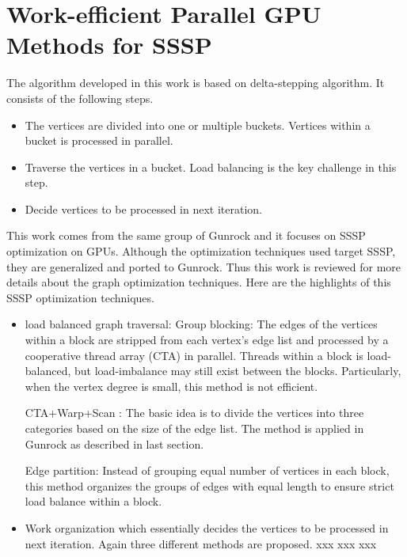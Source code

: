 \section{Work-efficient Parallel GPU Methods for SSSP}
The algorithm developed in this work \cite{Davidson2014work-efficient} is based
on delta-stepping algorithm. It consists of the following steps.
\begin{itemize}
    \item The vertices are divided into one or multiple buckets. Vertices within
        a bucket is processed in parallel.
    \item Traverse the vertices in a bucket. Load balancing is the key challenge
        in this step.
    \item Decide vertices to be processed in next iteration.
\end{itemize}

This work comes from the same group of Gunrock and it focuses on SSSP
optimization on GPUs. Although the optimization techniques used target
SSSP, they are generalized and ported to Gunrock. Thus this work is reviewed
for more details about the graph optimization techniques. Here are the highlights of
this SSSP optimization techniques.


\begin{itemize}
    \item load balanced graph traversal:
        \subitem Group blocking: The edges of the vertices within a block are
        stripped from each vertex's edge list and processed by a cooperative
        thread array (CTA) in parallel. Threads within a block is load-balanced,
        but load-imbalance may still exist between the blocks. Particularly,
        when the vertex degree is small, this method is not efficient.

        \subitem CTA+Warp+Scan \cite{merrill2012scalable}: The basic idea is to divide the vertices into
        three categories based on the size of the edge list. The method is
        applied in Gunrock as described in last section. 

        \subitem Edge partition: Instead of grouping equal number of vertices in
        each block, this method organizes the groups of edges with equal length
        to ensure strict load balance within a block. 
    \item Work organization which essentially decides the vertices to be
        processed in next iteration. Again three different methods are proposed.
        \subitem xxx
        \subitem xxx
        \subitem xxx
\end{itemize}

